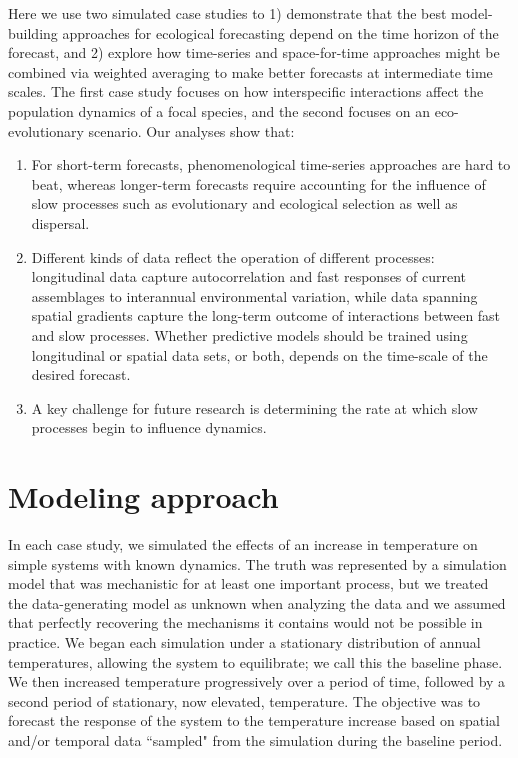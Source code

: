 \documentclass[11pt]{article}
\begin{document}
Here we use two simulated case studies to 1) demonstrate that the best model-building approaches for ecological forecasting 
depend on the time horizon of the forecast, and 2) explore how time-series and space-for-time approaches might be 
combined via weighted averaging to make better forecasts at intermediate time scales. The first case study
focuses on how interspecific interactions affect the population dynamics of a focal species, and the second focuses on
an eco-evolutionary scenario. Our analyses show that: 
\begin{enumerate}
	\item For short-term forecasts, phenomenological time-series approaches are hard to beat, whereas longer-term forecasts require accounting for the influence of slow processes such as evolutionary and ecological selection as well as dispersal.
	\item Different kinds of data reflect the operation of different processes: longitudinal data capture autocorrelation and fast responses of current assemblages to interannual environmental variation, while data spanning spatial gradients capture the long-term outcome of interactions between fast and slow processes.  Whether predictive models should be trained using longitudinal or spatial data sets, or both, depends on the time-scale of the desired forecast.
	\item A key challenge for future research is determining the rate at which slow processes begin to influence dynamics.
\end{enumerate}

\section*{Modeling approach}

In each case study, we simulated the effects of an increase in temperature on simple systems with known dynamics.
The truth was represented by a simulation model that was mechanistic for at least one important process, 
but we treated the data-generating model as unknown when analyzing the data and we assumed that perfectly recovering the mechanisms
it contains would not be possible in practice. We began each simulation
under a stationary distribution of annual temperatures, allowing the system to equilibrate; we call this the baseline phase. 
We then increased temperature progressively over a period of time, followed by a second period of stationary, now elevated, temperature. 
The objective was to forecast the response of the system to the temperature increase based on spatial and/or temporal data 
``sampled" from the simulation during the baseline period. 
\end{document}
